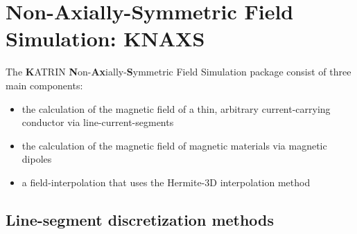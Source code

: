 \section{Non-Axially-Symmetric Field Simulation: KNAXS}\label{sec:KNAXS}
  The \textbf{K}ATRIN \textbf{N}on-\textbf{Ax}ially-\textbf{S}ymmetric Field Simulation package consist of three main components:
  \begin{itemize}
    \item the calculation of the magnetic field of a thin, arbitrary current-carrying conductor via line-current-segments
    \item the calculation of the magnetic field of magnetic materials via magnetic dipoles
    \item a field-interpolation that uses the Hermite-3D interpolation method
  \end{itemize}
  
  \subsection{Line-segment discretization methods}
